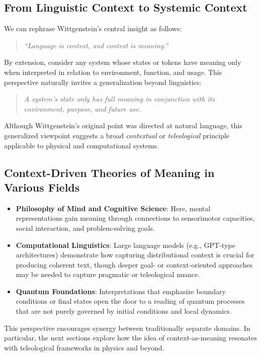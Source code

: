 \documentclass[11pt]{article}
\begin{document}
\subsection{From Linguistic Context to Systemic Context}
We can rephrase Wittgenstein’s central insight as follows:
\begin{quote}
    \textit{``Language is context, and context is meaning.''}
\end{quote}
By extension, consider any system whose states or tokens have meaning only when interpreted in relation to environment, function, and usage. This perspective naturally invites a generalization beyond linguistics:
\begin{quote}
    \textit{A system’s state only has full meaning in conjunction with its environment, purpose, and future use.}
\end{quote}
Although Wittgenstein’s original point was directed at natural language, this generalized viewpoint suggests a broad \emph{contextual} or \emph{teleological} principle applicable to physical and computational systems.

\subsection{Context-Driven Theories of Meaning in Various Fields}
\begin{itemize}
    \item \textbf{Philosophy of Mind and Cognitive Science}: Here, mental representations gain meaning through connections to sensorimotor capacities, social interaction, and problem-solving goals.
    \item \textbf{Computational Linguistics}: Large language models (e.g., GPT-type architectures) demonstrate how capturing distributional context is crucial for producing coherent text, though deeper goal- or context-oriented approaches may be needed to capture pragmatic or teleological nuance.
    \item \textbf{Quantum Foundations}: Interpretations that emphasize boundary conditions or final states open the door to a reading of quantum processes that are not purely governed by initial conditions and local dynamics.
\end{itemize}

This perspective encourages synergy between traditionally separate domains. In particular, the next sections explore how the idea of context-as-meaning resonates with teleological frameworks in physics and beyond.
\end{document}

